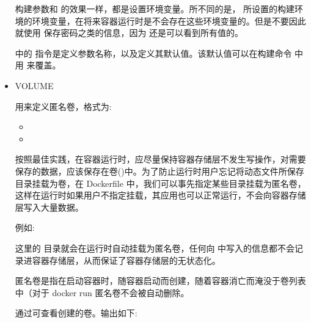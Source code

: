 \documentclass[letterpaper,10pt,english]{sphinxmanual}
\begin{document}
\begin{itemize}
\begin{itemize}
\end{itemize}

构建参数和  的效果一样，都是设置环境变量。所不同的是， 所设置的构建环境的环境变量，在将来容器运行时是不会存在这些环境变量的。但是不要因此就使用  保存密码之类的信息，因为  还是可以看到所有值的。

 中的  指令是定义参数名称，以及定义其默认值。该默认值可以在构建命令  中用  来覆盖。

\item {} 
VOLUME

用来定义匿名卷，格式为:
\begin{itemize}
\item {} 

\item {} 

\end{itemize}

按照最佳实践，在容器运行时，应尽量保持容器存储层不发生写操作，对需要保存的数据，应该保存在卷()中。为了防止运行时用户忘记将动态文件所保存目录挂载为卷，在 Dockerfile 中，我们可以事先指定某些目录挂载为匿名卷，这样在运行时如果用户不指定挂载，其应用也可以正常运行，不会向容器存储层写入大量数据。

例如:

\begin{sphinxVerbatim}[commandchars=\\\{\}]
 
\end{sphinxVerbatim}

这里的  目录就会在运行时自动挂载为匿名卷，任何向  中写入的信息都不会记录进容器存储层，从而保证了容器存储层的无状态化。

匿名卷是指在启动容器时，随容器启动而创建，随着容器消亡而淹没于卷列表中（对于 docker run 匿名卷不会被自动删除。

通过可查看创建的卷。输出如下:


\end{itemize}
\end{document}
